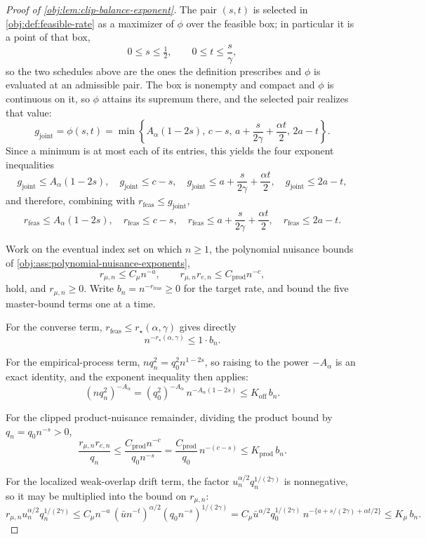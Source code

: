 \documentclass[11pt]{article}
\begin{document}
\begin{proof}[Proof of \cref{obj:lem:clip-balance-exponent}]
The pair \((s,t)\) is selected in \cref{obj:def:feasible-rate} as a maximizer of \(\phi\) over the feasible box; in particular it is a point of that box,
\[
0\le s\le\tfrac12,
\qquad
0\le t\le\frac{s}{\gamma},
\]
so the two schedules above are the ones the definition prescribes and \(\phi\) is evaluated at an admissible pair. %
The box is nonempty and compact and \(\phi\) is continuous on it, so \(\phi\) attains its supremum there, and the selected pair realizes that value:
\[
g_{\mathrm{joint}}=\phi(s,t)
=
\min\left\{
A_\alpha(1-2s),\,
c-s,\,
a+\frac{s}{2\gamma}+\frac{\alpha t}{2},\,
2a-t
\right\}.
\]
Since a minimum is at most each of its entries, this yields the four exponent inequalities
\[
g_{\mathrm{joint}}\le A_\alpha(1-2s),\quad
g_{\mathrm{joint}}\le c-s,\quad
g_{\mathrm{joint}}\le a+\frac{s}{2\gamma}+\frac{\alpha t}{2},\quad
g_{\mathrm{joint}}\le 2a-t,
\]
and therefore, combining with \(r_{\mathrm{feas}}\le g_{\mathrm{joint}}\),
\[
r_{\mathrm{feas}}\le A_\alpha(1-2s),\quad
r_{\mathrm{feas}}\le c-s,\quad
r_{\mathrm{feas}}\le a+\frac{s}{2\gamma}+\frac{\alpha t}{2},\quad
r_{\mathrm{feas}}\le 2a-t .
\]

Work on the eventual index set on which \(n\ge1\), the polynomial nuisance bounds of \cref{obj:ass:polynomial-nuisance-exponents},
\[
r_{\mu,n}\le C_\mu n^{-a},
\qquad
r_{\mu,n}r_{e,n}\le C_{\mathrm{prod}}n^{-c},
\]
hold, and \(r_{\mu,n}\ge0\).  Write \(b_n=n^{-r_{\mathrm{feas}}}\ge0\) for the target rate, and bound the five master-bound terms one at a time.

For the converse term, \(r_{\mathrm{feas}}\le r_\star(\alpha,\gamma)\) gives directly
\[
n^{-r_\star(\alpha,\gamma)}\le 1\cdot b_n .
\]

For the empirical-process term, \(nq_n^2=q_0^2n^{1-2s}\), so raising to the power \(-A_\alpha\) is an exact identity, and the exponent inequality then applies:
\[
(nq_n^2)^{-A_\alpha}
=
(q_0^2)^{-A_\alpha}\,n^{-A_\alpha(1-2s)}
\le
K_{\mathrm{off}}\,b_n .
\]

For the clipped product-nuisance remainder, dividing the product bound by \(q_n=q_0n^{-s}>0\),
\[
\frac{r_{\mu,n}r_{e,n}}{q_n}
\le
\frac{C_{\mathrm{prod}}n^{-c}}{q_0n^{-s}}
=
\frac{C_{\mathrm{prod}}}{q_0}\,n^{-(c-s)}
\le
K_{\mathrm{prod}}\,b_n .
\]

For the localized weak-overlap drift term, the factor \(u_n^{\alpha/2}q_n^{1/(2\gamma)}\) is nonnegative, so it may be multiplied into the bound on \(r_{\mu,n}\):
\[
r_{\mu,n}u_n^{\alpha/2}q_n^{1/(2\gamma)}
\le
C_\mu n^{-a}\,(\bar u n^{-t})^{\alpha/2}(q_0n^{-s})^{1/(2\gamma)}
=
C_\mu\bar u^{\alpha/2}q_0^{1/(2\gamma)}\,
n^{-\{a+s/(2\gamma)+\alpha t/2\}}
\le
K_\mu\,b_n .
\]


\end{proof}
\end{document}
